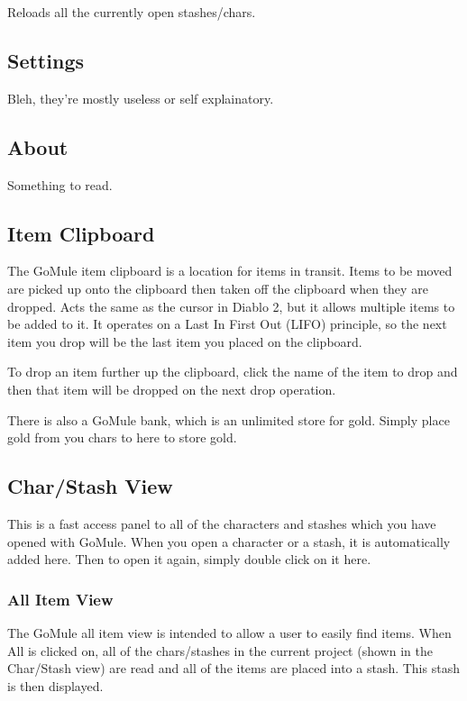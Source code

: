 \documentclass[a4paper,10pt]{article}
\begin{document}
Reloads all the currently open stashes/chars.

\subsection{Settings}

Bleh, they're mostly useless or self explainatory.

\subsection{About}

Something to read.

\subsection{Item Clipboard}

The GoMule item clipboard is a location for items in transit. Items to be moved are picked up onto the clipboard then taken off the clipboard when they are dropped. Acts the same as the cursor in Diablo 2, but it allows multiple items to be added to it. It operates on a Last In First Out (LIFO) principle, so the next item you drop will be the last item you placed on the clipboard.

To drop an item further up the clipboard, click the name of the item to drop and then that item will be dropped on the next drop operation.

There is also a GoMule bank, which is an unlimited store for gold. Simply place gold from you chars to here to store gold.

\subsection{Char/Stash View}

This is a fast access panel to all of the characters and stashes which you have opened with GoMule. When you open a character or a stash, it is automatically added here. Then to open it again, simply double click on it here.

\subsubsection{All Item View}

The GoMule all item view is intended to allow a user to easily find items. When All is clicked on, all of the chars/stashes in the current project (shown in the Char/Stash view) are read and all of the items are placed into a stash. This stash is then displayed.
\end{document}
